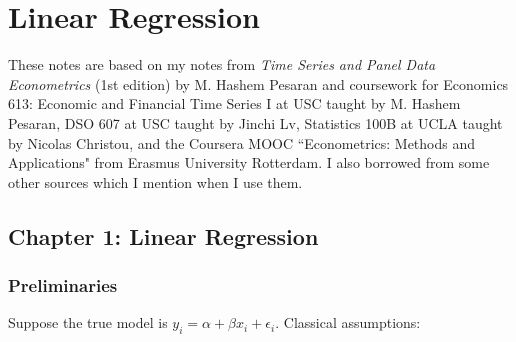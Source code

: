 %
%
%
%
%
%
%
%
%
%
%
%
%
%

\section{Linear Regression}

These notes are based on my notes from \textit{Time Series and Panel Data Econometrics} (1st edition) by M. Hashem Pesaran \citep{pesaran-2015-text} and coursework for Economics 613: Economic and Financial Time Series I at USC taught by M. Hashem Pesaran, DSO 607 at USC taught by Jinchi Lv, Statistics 100B at UCLA taught by Nicolas Christou, and the Coursera MOOC ``Econometrics: Methods and Applications" from Erasmus University Rotterdam. I also borrowed from some other sources which I mention when I use them.



\subsection{Chapter 1: Linear Regression}

\subsubsection{Preliminaries}

Suppose the true model is \(y_i = \alpha + \beta x_i + \epsilon_i\). Classical assumptions:


